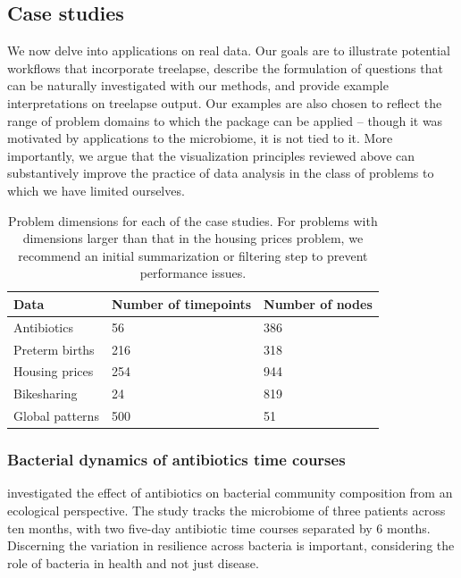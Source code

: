 \subsection{Case studies}\label{case-studies}

We now delve into applications on real data. Our goals are to illustrate
potential workflows that incorporate treelapse, describe the formulation of
questions that can be naturally investigated with our methods, and provide
example interpretations on treelapse output. Our examples are also chosen to
reflect the range of problem domains to which the package can be applied --
though it was motivated by applications to the microbiome, it is not tied to it.
More importantly, we argue that the visualization principles reviewed above can
substantively improve the practice of data analysis in the class of problems to
which we have limited ourselves.

\begin{table}
\centering
\begin{tabular}{|l|l|l|}
  \hline
  Data            & Number of timepoints & Number of nodes \\
  \hline
  Antibiotics     & 56                 & 386             \\
  Preterm births  & 216                & 318             \\
  Housing prices  & 254                & 944             \\
  Bikesharing     & 24                 & 819             \\
  Global patterns & 500                & 51             \\
  \hline
\end{tabular}
\caption{Problem dimensions for each of the case studies. For problems with
  dimensions larger than that in the housing prices problem, we recommend an
  initial summarization or filtering step to prevent performance
  issues. \label{problem-scaling}}
\end{table}

\subsubsection{Bacterial dynamics of antibiotics time
courses}\label{bacterial-dynamics-of-antibiotics-time-courses}

\citet{dethlefsen2008pervasive} investigated the effect of antibiotics on
bacterial community composition from an ecological perspective. The study tracks
the microbiome of three patients across ten months, with two five-day antibiotic
time courses separated by 6 months. Discerning the variation in resilience
across bacteria is important, considering the role of bacteria in health and
not just disease.

